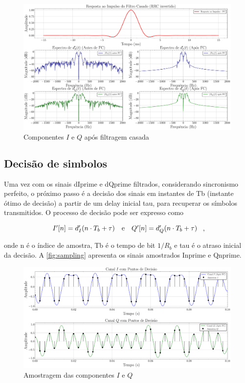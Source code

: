 \begin{figure}[H]
	\centering
	\caption{Componentes $I$ e $Q$ após filtragem casada}\label{fig:matchedfilter}
	\includegraphics[width=\linewidth]{assets/cap2/matchedfilter.pdf}
\end{figure}


\subsection{Decisão de simbolos}

Uma vez com os sinais \gls{dIprime} e \gls{dQprime} filtrados, considerando sincronismo perfeito, o próximo passo é a decisão dos sinais em instantes de \gls{Tb} (instante ótimo de decisão) a partir de um delay inicial \gls{tau}, para recuperar os símbolos transmitidos. O processo de decisão pode ser expresso como

\vspace{-1em}
\begin{equation}
    \begin{array}{c@{\quad\text{e}\quad}c}
        I'[n] = d'_I(n \cdot T_b + \tau) & Q'[n] = d'_Q(n \cdot T_b + \tau)
    \end{array} \text{ ,}
\end{equation}

\noindent onde \gls{n} é o índice de amostra, \gls{Tb} é o tempo de bit $1/R_b$ e \gls{tau} é o atraso inicial da decisão. A \autoref{fig:sampling} apresenta os sinais amostrados \gls{Inprime} e \gls{Qnprime}. 

\begin{figure}[H]
	\centering
	\caption{Amostragem das componentes $I$ e $Q$}\label{fig:sampling}
	\includegraphics[width=\linewidth]{assets/cap2/sampling.pdf}
    
\end{figure}

